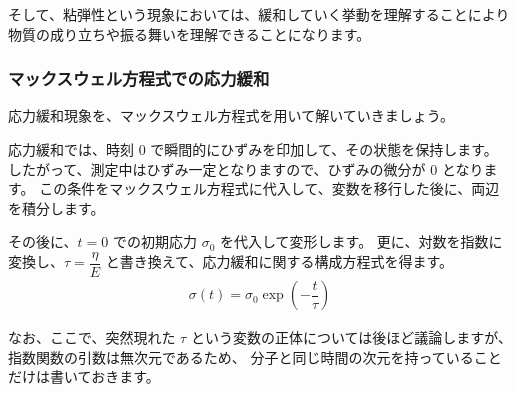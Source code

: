 \documentclass[uplatex,dvipdfmx,a4paper,11pt]{jsreport}
\begin{document}
そして、粘弾性という現象においては、緩和していく挙動を理解することにより物質の成り立ちや振る舞いを理解できることになります。


\subsubsection{マックスウェル方程式での応力緩和}
応力緩和現象を、マックスウェル方程式を用いて解いていきましょう。

応力緩和では、時刻 0 で瞬間的にひずみを印加して、その状態を保持します。
したがって、測定中はひずみ一定となりますので、ひずみの微分が 0 となります。
この条件をマックスウェル方程式に代入して、変数を移行した後に、両辺を積分します。

その後に、$t=0$ での初期応力 $\sigma_0$ を代入して変形します。
更に、対数を指数に変換し、$\tau = \dfrac{\eta}{E}$ と書き換えて、応力緩和に関する構成方程式を得ます。
\begin{align}
	\sigma(t) = \sigma_0 \exp \left(-\dfrac{t}{\tau} \right)
\end{align}

なお、ここで、突然現れた $\tau$ という変数の正体については後ほど議論しますが、指数関数の引数は無次元であるため、
分子と同じ時間の次元を持っていることだけは書いておきます。
\end{document}

